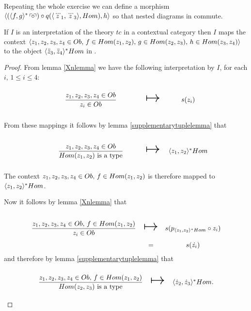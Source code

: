 Repeating the whole exercise we can  define a morphism $\langle(\langle f,g\rangle^*\left\ulcorner\kern-2pt\circ \kern-2pt\right\urcorner) \circ q(\langle\dddot z_1,\dddot z_3\rangle,Hom),h\rangle$ so that nested diagrams in
commute.


\begin{lemma}
If $I$ is an interpretation of the theory $tc$ in a contextual category \catcw then
$I$ maps the context $\langle z_1,z_2,z_3,z_4 \in Ob,\,f \in Hom(z_1,z_2),\,g \in Hom(z_2,z_3),\,h \in Hom(z_3,z_4)\rangle$ to the object $\langle\ddot z_3,\ddot z_4\rangle^*Hom$ in \catc.
\end{lemma}
\begin{proof}
\newcommand {\forceSOURCEwidth}{\rule{5cm}{0pt}}  %
\newcommand {\forceTARGETwidth}{\rule{2.2cm}{0pt}}

From lemma \ref{Xnlemma} we have the following interpretation by $I$, for each $i$, $1 \leq i \leq 4$:
\begin{equation*}
\begin{array}{c c c}
\forceSOURCEwidth & & \forceTARGETwidth \\ [-0.1cm]
\gatdisplayrule{\zOOOO}{\ofT{z_i}{Ob}} & \Imapsto & s(z_i) 
\end{array}
\end{equation*}

From these mappings it follows by lemma \ref{supplementarytuplelemma} that 

\begin{equation*}
\begin{array}{c c c}
\forceSOURCEwidth & & \forceTARGETwidth \\ [-0.1cm]
\gatdisplayrule{\zOOOO}{\isT{Hom(z_1,z_2)}} & \Imapsto & \associativitypremisepoppopmapped 
\end{array}
\end{equation*}

The context $z_1,z_2,z_3,z_4 \in Ob,\,f \in Hom(z_1,z_2)$ is therefore mapped to $\langle z_1,z_2\rangle^*Hom$.

Now it follows by lemma \ref{Xnlemma} that 

\begin{equation*}
\begin{array}{c c c}
\forceSOURCEwidth & & \forceTARGETwidth \\ [-0.1cm]
\gatdisplayrule{\associativitypremisepoppop}{\ofT{z_i}{Ob}} & \Imapsto & s(p_{\associativitypremisepoppopmapped} \circ z_i) \\
                                                            & = & s(\dot{z_i})
\end{array}
\end{equation*}
and therefore by  lemma \ref{supplementarytuplelemma} that 
\begin{equation*}
\begin{array}{c c c}
\forceSOURCEwidth & & \forceTARGETwidth \\ [-0.1cm]
\gatdisplayrule{\associativitypremisepoppop}{\isT{Hom(z_2,z_3)}} & \Imapsto & \associativitypremisepopmapped.
\end{array}
\end{equation*}


\end{proof}
